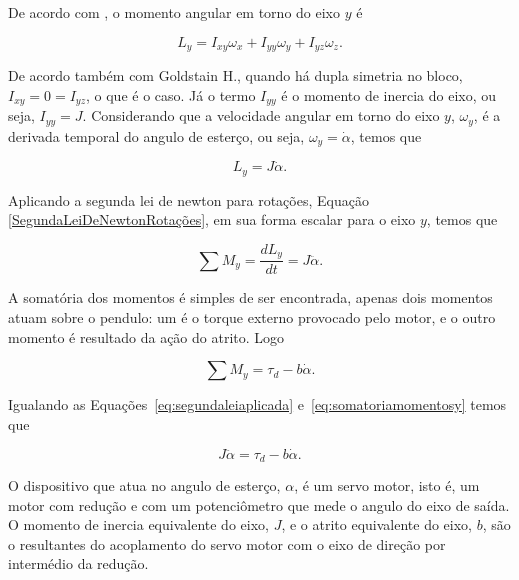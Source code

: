         De acordo com \cite{book:goldstein}, o momento angular em torno do eixo $y$ é
        
        \begin{equation}
            L_y = I_{xy}\omega_x + I_{yy}\omega_y + I_{yz}\omega_z.
            \label{MomentoAngularOriginal}
        \end{equation}
        
        De acordo também com Goldstain H., quando há dupla simetria no bloco, $I_{xy} = 0 = I_{yz}$, o que é o caso. Já o termo $I_{yy}$ é o momento de inercia do eixo, ou seja, $I_{yy}=J$. Considerando que a velocidade angular em torno do eixo $y$, $\omega_y$, é a derivada temporal do angulo de esterço, ou seja, $\omega_y=\dot \alpha$, temos que
        
        \begin{equation}
            L_y = J \dot \alpha.
        \end{equation}
        
        Aplicando a segunda lei de newton para rotações, Equação \eqref{SegundaLeiDeNewtonRotações}, em sua forma escalar para o eixo $y$, temos que
            
        \begin{equation}
            \sum M_y
            = \frac{d L_y}{dt}
            = J \ddot \alpha.
            \label{eq:segundaleiaplicada}
        \end{equation}
        
        A somatória dos momentos é simples de ser encontrada, apenas dois momentos atuam sobre o pendulo: um é o torque externo provocado pelo motor, e o outro momento é resultado da ação do atrito. Logo
    
        \begin{equation}
            \sum M_y  = \tau _d - b \dot \alpha.
            \label{eq:somatoriamomentosy}
        \end{equation}
    
        Igualando as Equações~\eqref{eq:segundaleiaplicada} e~\eqref{eq:somatoriamomentosy} temos que
        
        \begin{equation}
            J \ddot \alpha  = \tau _d - b \dot \alpha.
        \end{equation}
        
        O dispositivo que atua no angulo de esterço, $\alpha$, é um servo motor, isto é, um motor com redução e com um potenciômetro que mede o angulo do eixo de saída. O momento de inercia equivalente do eixo, $J$, e o atrito equivalente do eixo, $b$, são o resultantes do acoplamento do servo motor com o eixo de direção por intermédio da redução.
        
